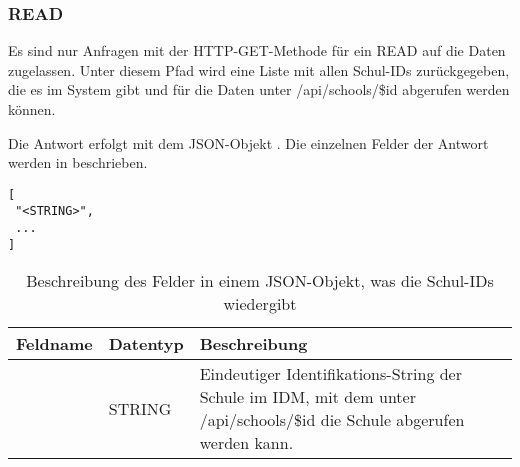 \subsubsection{READ}
\label{sec:rest:api:school:read}
Es sind nur Anfragen mit der HTTP-GET-Methode für ein READ auf die Daten zugelassen.
Unter diesem Pfad wird eine Liste mit allen Schul-IDs zurückgegeben, die es im System gibt und für die Daten unter /api/schools/\$id abgerufen werden können.

Die Antwort erfolgt mit dem JSON-Objekt . 
Die einzelnen Felder der Antwort werden in  beschrieben.

\begin{lstlisting}[caption={JSON-Antwort für einen GET-Aufruf des Pfads /api/schools},label={lst:code:rest:api:school:read:ret},frame=tlrb]
[
 "<STRING>",
 ...
]
\end{lstlisting}

\begin{longtable}{|p{}|p{}|p{}|}
		\caption{Beschreibung des Felder in einem JSON-Objekt, was die Schul-IDs wiedergibt}
\endfoot
		\caption{Beschreibung des Felder in einem JSON-Objekt, was die Schul-IDs wiedergibt}
		\label{tab:rest:api:school:read:ret}
\endlastfoot 
\hline
			\textbf{Feldname} & \textbf{Datentyp} & \textbf{Beschreibung} \\ \hline
\endhead
 & STRING & Eindeutiger Identifikations-String der Schule im IDM, mit dem unter /api/schools/\$id die Schule abgerufen werden kann.\\ \hline
\end{longtable}

